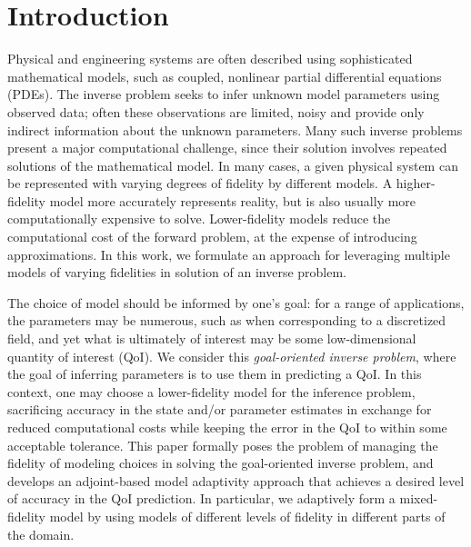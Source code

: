\section{Introduction}

Physical and engineering systems are often described using sophisticated mathematical models, such as coupled, nonlinear partial differential equations (PDEs). The inverse problem seeks to infer unknown model parameters using observed data; often these observations are limited, noisy and provide only indirect information about the unknown parameters.
Many such inverse problems present a major computational challenge, since their solution involves repeated solutions of the mathematical model.  In many cases, a given physical system can be represented with varying degrees of fidelity by different models. A higher-fidelity model more accurately represents reality, but is also usually more computationally expensive to solve. Lower-fidelity models reduce the computational cost of the forward problem, at the expense of introducing approximations.
In this work, we formulate an approach for leveraging multiple models of varying fidelities in solution of an inverse problem.

The choice of model should be informed by one's goal: for a range of applications, the parameters may be numerous, such as when corresponding to a discretized field, and yet what is ultimately of interest may be some low-dimensional quantity of interest (QoI). We consider this \textit{goal-oriented inverse problem}, where the goal of inferring parameters is to use them in predicting a QoI. In this context, one may choose a lower-fidelity model for the inference problem, sacrificing accuracy in the state and/or parameter estimates in exchange for reduced computational costs while keeping the error in the QoI to within some acceptable tolerance.  This paper formally poses the problem of managing the fidelity of modeling choices in solving the goal-oriented inverse problem, and develops an adjoint-based model adaptivity approach that achieves a desired level of accuracy in the QoI prediction. In particular, we adaptively form a mixed-fidelity model by using models of different levels of fidelity in different parts of the domain.

